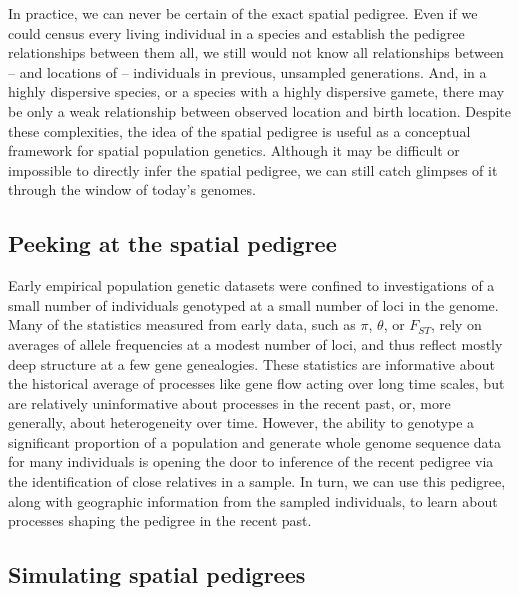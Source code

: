 \documentclass{ar-1col}
\begin{document}
In practice, we can never be certain of the exact spatial pedigree.
Even if we could census every living individual in a species
and establish the pedigree relationships between them all,
we still would not know all relationships between -- 
and locations of -- 
individuals in previous, unsampled generations.
And, in a highly dispersive species,
or a species with a highly dispersive gamete,
there may be only a weak relationship between observed location and birth location.
Despite these complexities,
the idea of the spatial pedigree is useful
as a conceptual framework for spatial population genetics.
Although it may be difficult or impossible
to directly infer the spatial pedigree,
we can still catch glimpses of it through the window of today's genomes.

\subsection{Peeking at the spatial pedigree}
Early empirical population genetic datasets were confined to 
investigations of a small number of individuals 
genotyped at a small number of loci in the genome.
Many of the statistics measured from early data, 
such as $\pi$, $\theta$, or $F_{ST}$,
rely on averages of allele frequencies
at a modest number of loci,
and thus reflect mostly deep structure at a few gene genealogies.
These statistics are informative about 
the historical average of processes like gene flow acting over long time scales, 
but are relatively uninformative about processes in the recent past, 
or, more generally, about heterogeneity over time.
However, the ability to genotype a significant proportion of a population 
and generate whole genome sequence data for many individuals 
is opening the door to inference of the recent pedigree 
via the identification of close relatives in a sample.
In turn, we can use this pedigree, 
along with geographic information from the sampled individuals, 
to learn about processes shaping the pedigree in the recent past.

\subsection{Simulating spatial pedigrees}
\end{document}
